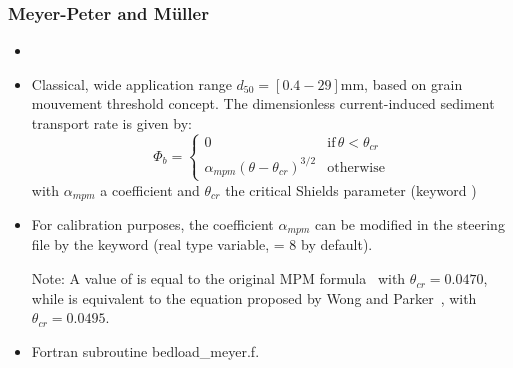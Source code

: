 \subsubsection{Meyer-Peter and M\"uller}
\begin{itemize}
\item {}
\item Classical, wide application range $d_{50} = [0.4-29]$mm, based on grain mouvement threshold concept. The dimensionless current-induced sediment transport rate is given by:
\begin{equation*}
\Phi_b=\left\{\begin{array}{ll}
0 & \text{if}\,\theta<\theta_{cr}\\
\alpha_{mpm}(\theta-\theta_{cr})^{3/2} & \text{otherwise}
\end{array}
\right.
\end{equation*}
with $\alpha_{mpm}$ a coefficient and $\theta_{cr}$ the critical Shields parameter (keyword )

\item For calibration purposes, the coefficient $\alpha_{mpm}$ can be modified in the steering file by the keyword  (real type variable, {\ttfamily = 8} by default).

  \begin{WarningBlock}{Note:}
  A value of  is equal to the original MPM formula~\cite{GarciaBook2006} with $\theta_{cr}=0.0470$, while  is equivalent to the equation proposed by Wong and Parker~\cite{WongParker06}, with $\theta_{cr}=0.0495$.      
\end{WarningBlock}
  
\item Fortran subroutine {\ttfamily bedload\_meyer.f}.

\end{itemize}

